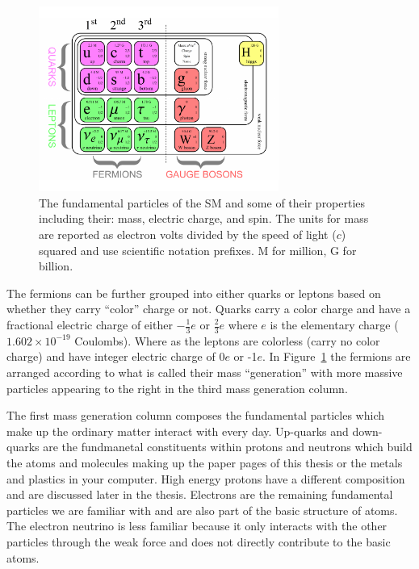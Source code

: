 \begin{figure}[htbp]
\centering
     \includegraphics[width=0.7\textwidth]{introduction/plots/sm_particles.pdf}
     \caption{
The fundamental particles of the SM and some of their properties including their:
mass, electric charge, and spin. The units for mass are reported as electron volts divided by
the speed of light ($c$) squared and use scientific notation prefixes.
M for million, G for billion.
     }
     \label{fig:sm_particles}
\end{figure}

The fermions can be further grouped into either quarks or leptons based on whether
they carry ``color'' charge or not. 
Quarks carry a color charge and have a fractional electric charge of either $-\frac{1}{3}e$ or $\frac{2}{3}e$
where $e$ is the elementary charge ($1.602 \times 10^{-19}$ Coulombs).
Where as the leptons are colorless (carry no color charge) and
have integer electric charge of 0$e$ or -1$e$. In Figure~\ref{fig:sm_particles} the fermions are
arranged according to what is called their mass ``generation'' with more massive
particles appearing to the right in the third mass generation column.

The first
mass generation column composes the fundamental particles which make up the ordinary matter
interact with every day. Up-quarks and down-quarks are the fundmanetal constituents within
protons and neutrons which build the atoms and molecules
making up the paper pages of this thesis or the metals and plastics in your computer. High energy protons
have a different composition and are discussed later in the thesis. Electrons are the
remaining fundamental particles we are familiar with and are also part of the basic 
structure of atoms. The electron neutrino is less familiar because it only
interacts with the other particles through the weak force and does not directly
contribute to the basic atoms.

